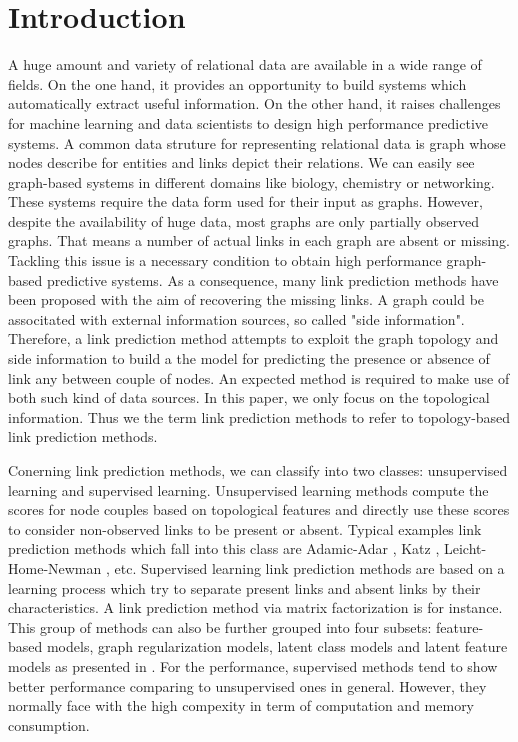 \documentclass[runningheads,a4paper]{llncs}
\begin{document}
\section{Introduction}
A huge amount and variety of relational data are available in a wide range of fields. On the one hand, it provides an opportunity to build systems which automatically extract useful information. On the other hand, it raises challenges for machine learning and data scientists to design high performance predictive systems. A common data struture for representing relational data is graph whose nodes describe for entities and links depict their relations. We can easily see graph-based systems in different domains like biology, chemistry or networking. These systems require the data form used for their input as graphs. However, despite the availability of huge data, most graphs are only partially observed graphs. That means a number of actual links in each graph are absent or missing. Tackling this issue is a necessary condition to obtain high performance graph-based predictive systems. As a consequence, many link prediction methods have been proposed with the aim of recovering the missing links. A graph could be associtated with external information sources, so called "side information". Therefore, a link prediction method attempts to exploit the graph topology and side information to build a the model for predicting the presence or absence of link any between couple of nodes. An expected method is required to make use of both such kind of data sources. In this paper, we only focus on the topological information. Thus we the term link prediction methods to refer to topology-based link prediction methods.

Conerning link prediction methods, we can classify into two classes: unsupervised learning and supervised learning. Unsupervised learning methods compute the scores for node couples based on topological features and directly use these scores to consider non-observed links to be present or absent. Typical examples link prediction methods which fall into this class are Adamic-Adar \cite{adamic}, Katz \cite{katz}, Leicht-Home-Newman \cite{lhni}, etc. Supervised learning link prediction methods are based on a learning process which try to separate present links and absent links by their characteristics. A link prediction method via matrix factorization \cite{matrix-factorization} is for instance. This group of methods can also be further grouped into four subsets: feature-based models, graph regularization models, latent class models and latent feature models as presented in \cite{matrix-factorization}. For the performance, supervised methods tend to show better performance comparing to unsupervised ones in general. However, they normally face with the high compexity in term of computation and memory consumption.
\end{document}

